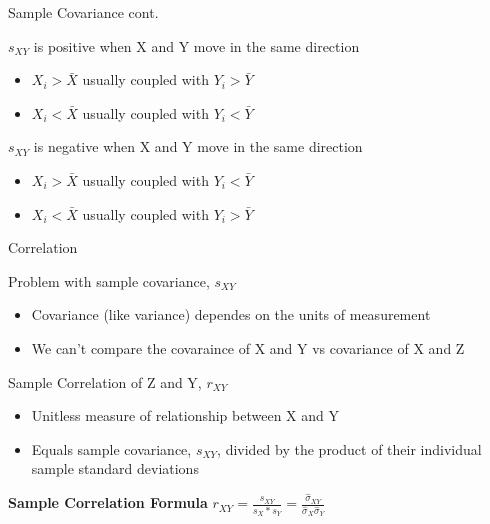 \documentclass[
  8pt,
  ignorenonframetext,
  dvipsnames]{beamer}
\providecommand{\tightlist}{%
  \setlength{\itemsep}{0pt}\setlength{\parskip}{0pt}}
\renewcommand{\textbf}[1]{{\color{darkgray}\bfseries\fontfamily{Montserrat-TOsF}#1}}
\let\olditem\item
\renewcommand{\item}{%
  \olditem\vspace{4pt}
}
\begin{document}
\begin{frame}{Sample Covariance cont.}
\protect\hypertarget{sample-covariance-cont.}{}

\(s_{XY}\) is positive when X and Y move in the same direction

\begin{itemize}
\tightlist
\item
  \(X_i > \bar{X}\) usually coupled with \(Y_i > \bar{Y}\)
\item
  \(X_i < \bar{X}\) usually coupled with \(Y_i < \bar{Y}\)
\end{itemize}

\medskip

\(s_{XY}\) is negative when X and Y move in the same direction

\begin{itemize}
\tightlist
\item
  \(X_i > \bar{X}\) usually coupled with \(Y_i < \bar{Y}\)
\item
  \(X_i < \bar{X}\) usually coupled with \(Y_i > \bar{Y}\)
\end{itemize}

\end{frame}

\begin{frame}{Correlation}
\protect\hypertarget{correlation}{}

Problem with sample covariance, \(s_{XY}\)

\begin{itemize}
\tightlist
\item
  Covariance (like variance) dependes on the units of measurement
\item
  We can't compare the covaraince of X and Y vs covariance of X and Z
\end{itemize}

\medskip

Sample Correlation of Z and Y, \(r_{XY}\)

\begin{itemize}
\tightlist
\item
  Unitless measure of relationship between X and Y
\item
  Equals sample covariance, \(s_{XY}\), divided by the product of their
  individual sample standard deviations
\end{itemize}

\medskip

\textbf{Sample Correlation Formula}
\(r_{XY}=\frac{s_{XY}}{s_X*s_Y} = \frac{\hat{\sigma}_{XY}}{\hat{\sigma}_X \hat{\sigma}_Y}\)

\end{frame}
\end{document}
